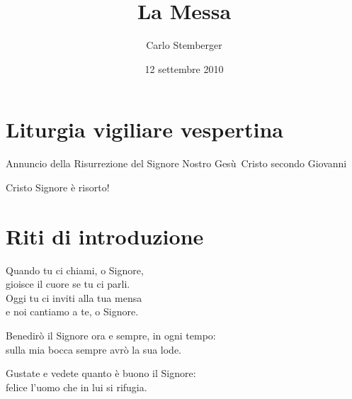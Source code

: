 \documentclass[leaflet,rite=ambrosian,litcolor=red,biblerefstyle=CEI]{missa}
\title{La Messa}
\author{Carlo Stemberger}
\date{12 settembre 2010} %
\newcommand{\TODO}{\makecolorbox{green}{\textcolor{red}{TODO}}}
\begin{document}


\section{Liturgia vigiliare vespertina}
\par\TODO

Annuncio della Risurrezione del Signore Nostro Gesù~Cristo secondo Giovanni

\gospel[Sat]

Cristo Signore è risorto!

\all{\tbtg[!]}

\section{Riti di introduzione}

\begin{refrain}
Quando tu ci chiami, o Signore,\\
gioisce il cuore se tu ci parli.\\
Oggi tu ci inviti alla tua mensa\\
e noi cantiamo a te, o Signore.
\end{refrain}
\begin{lyrics}
Benedirò il Signore ora e sempre, in ogni tempo:\\
sulla mia bocca sempre avrò la sua lode. \R

Gustate e vedete quanto è buono il Signore:\\
felice l'uomo che in lui si rifugia. \R
\end{lyrics}

\otherwise \hfill {}



\silence

\end{document}
